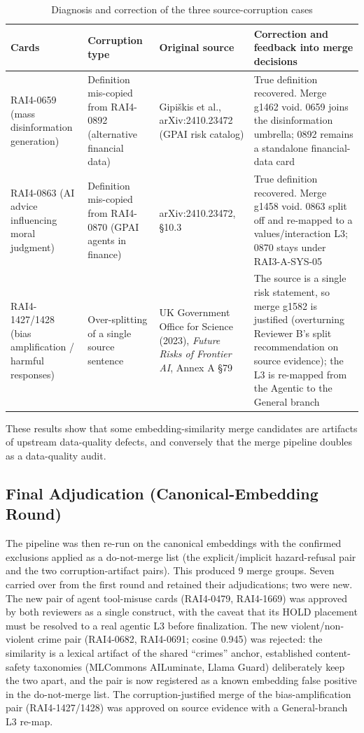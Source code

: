 \documentclass[11pt,a4paper]{article}
\begin{document}
\begin{table}[htbp]
\centering
\small
\caption{Diagnosis and correction of the three source-corruption cases}
\begin{tabular}{p{2.7cm}p{3.3cm}p{3.1cm}p{5.1cm}}
\toprule
Cards & Corruption type & Original source & Correction and feedback into merge decisions \\
\midrule
RAI4-0659 (mass disinformation generation) & Definition mis-copied from RAI4-0892 (alternative financial data) & Gipi\v{s}kis et al., arXiv:2410.23472 (GPAI risk catalog) & True definition recovered. Merge g1462 void. 0659 joins the disinformation umbrella; 0892 remains a standalone financial-data card \\
RAI4-0863 (AI advice influencing moral judgment) & Definition mis-copied from RAI4-0870 (GPAI agents in finance) & arXiv:2410.23472, \S10.3 & True definition recovered. Merge g1458 void. 0863 split off and re-mapped to a values/interaction L3; 0870 stays under RAI3-A-SYS-05 \\
RAI4-1427/1428 (bias amplification / harmful responses) & Over-splitting of a single source sentence & UK Government Office for Science (2023), \emph{Future Risks of Frontier AI}, Annex A \S79 & The source is a single risk statement, so merge g1582 is justified (overturning Reviewer B's split recommendation on source evidence); the L3 is re-mapped from the Agentic to the General branch \\
\bottomrule
\end{tabular}
\end{table}

These results show that some embedding-similarity merge candidates are artifacts of upstream data-quality defects, and conversely that the merge pipeline doubles as a data-quality audit.

\subsection{Final Adjudication (Canonical-Embedding Round)}

The pipeline was then re-run on the canonical embeddings with the confirmed exclusions applied as a do-not-merge list (the explicit/implicit hazard-refusal pair and the two corruption-artifact pairs). This produced 9 merge groups. Seven carried over from the first round and retained their adjudications; two were new. The new pair of agent tool-misuse cards (RAI4-0479, RAI4-1669) was approved by both reviewers as a single construct, with the caveat that its HOLD placement must be resolved to a real agentic L3 before finalization. The new violent/non-violent crime pair (RAI4-0682, RAI4-0691; cosine 0.945) was rejected: the similarity is a lexical artifact of the shared ``crimes'' anchor, established content-safety taxonomies (MLCommons AILuminate, Llama Guard) deliberately keep the two apart, and the pair is now registered as a known embedding false positive in the do-not-merge list. The corruption-justified merge of the bias-amplification pair (RAI4-1427/1428) was approved on source evidence with a General-branch L3 re-map.
\end{document}
